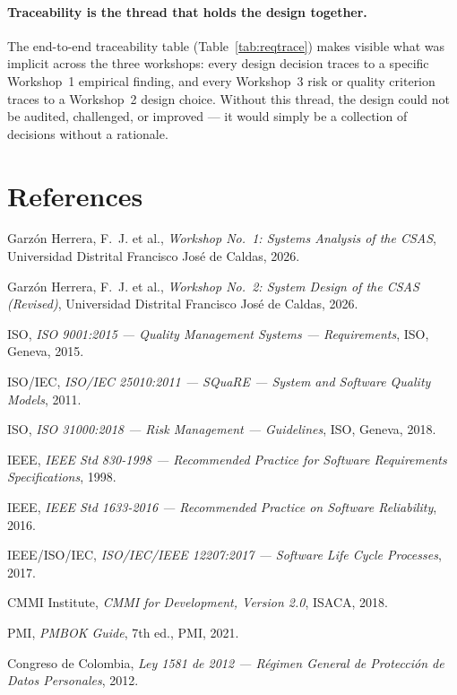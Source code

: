 \documentclass[12pt,a4paper]{article}
\begin{document}
\paragraph{Traceability is the thread that holds the design together.}
The end-to-end traceability table (Table~\ref{tab:reqtrace}) makes
visible what was implicit across the three workshops: every design
decision traces to a specific Workshop~1 empirical finding, and every
Workshop~3 risk or quality criterion traces to a Workshop~2 design
choice. Without this thread, the design could not be audited,
challenged, or improved --- it would simply be a collection of
decisions without a rationale.

\section*{References}
\begin{enumerate}[label={[\arabic*]},leftmargin=1.5em,itemsep=2pt]
\item Garzón Herrera, F.~J. et al., \emph{Workshop No.\ 1: Systems Analysis of the CSAS}, Universidad Distrital Francisco José de Caldas, 2026.
\item Garzón Herrera, F.~J. et al., \emph{Workshop No.\ 2: System Design of the CSAS (Revised)}, Universidad Distrital Francisco José de Caldas, 2026.
\item ISO, \emph{ISO 9001:2015 --- Quality Management Systems --- Requirements}, ISO, Geneva, 2015.
\item ISO/IEC, \emph{ISO/IEC 25010:2011 --- SQuaRE --- System and Software Quality Models}, 2011.
\item ISO, \emph{ISO 31000:2018 --- Risk Management --- Guidelines}, ISO, Geneva, 2018.
\item IEEE, \emph{IEEE Std 830-1998 --- Recommended Practice for Software Requirements Specifications}, 1998.
\item IEEE, \emph{IEEE Std 1633-2016 --- Recommended Practice on Software Reliability}, 2016.
\item IEEE/ISO/IEC, \emph{ISO/IEC/IEEE 12207:2017 --- Software Life Cycle Processes}, 2017.
\item CMMI Institute, \emph{CMMI for Development, Version 2.0}, ISACA, 2018.
\item PMI, \emph{PMBOK Guide}, 7th ed., PMI, 2021.
\item Congreso de Colombia, \emph{Ley 1581 de 2012 --- Régimen General de Protección de Datos Personales}, 2012.
\end{enumerate}
\end{document}
